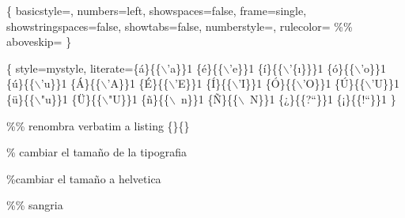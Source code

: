 \documentclass[presentation]{beamer}
\begin{document}
\usepackage{xcolor}

\usepackage{listings}
\{
   basicstyle=\ttfamily\small,
   numbers=left,
   showspaces=false,
   frame=single,
   showstringspaces=false, 
   showtabs=false, 
   numberstyle=\tiny,
   rulecolor=\color{lightgray}
   \%\% aboveskip=\parskip
\}

\lstset\{
  style=mystyle,
  literate=\{á\}\{\{$\backslash$'a\}\}1
  \{é\}\{\{$\backslash$'e\}\}1
  \{í\}\{\{$\backslash$'\{\i\}\}\}1
  \{ó\}\{\{$\backslash$'o\}\}1
  \{ú\}\{\{$\backslash$'u\}\}1
  \{Á\}\{\{$\backslash$'A\}\}1
  \{É\}\{\{$\backslash$'E\}\}1
  \{Í\}\{\{$\backslash$'I\}\}1
  \{Ó\}\{\{$\backslash$'O\}\}1
  \{Ú\}\{\{$\backslash$'U\}\}1
  \{ü\}\{\{$\backslash$"u\}\}1
  \{Ü\}\{\{$\backslash$"U\}\}1
  \{ñ\}\{\{$\backslash$~n\}\}1
  \{Ñ\}\{\{$\backslash$~N\}\}1
  \{¿\}\{\{?``\}\}1
  \{¡\}\{\{!``\}\}1
\}

\%\% renombra verbatim a listing
\let\verbatim\someundefinedcommand
{}
\{\}\{\}


\% cambiar el tamaño de la tipografia
\setlength{\headheight}{12.5pt}

\%cambiar el tamaño a helvetica
\renewcommand\familydefault{\sfdefault} 

\%\% sangria
\setlength{\parindent}{0pt}
\end{document}
